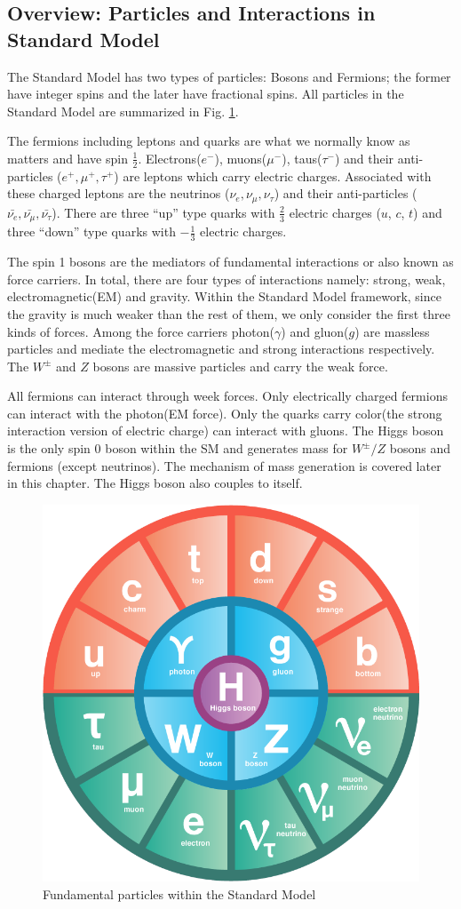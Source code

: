 \label{sec:theory-sm}
\subsection{Overview: Particles and Interactions in Standard Model}

The Standard Model has two types of particles: Bosons and Fermions; the former have integer spins and the later have fractional spins. All particles in the Standard Model are summarized in Fig. \ref{fig:theory-sm}.

The fermions including leptons and quarks are what we normally know as matters and have spin $\frac{1}{2}$. Electrons($e^-$), muons($\mu^-$), taus($\tau^{-}$) and their anti-particles ($e^+,\mu^+,\tau^+$) are leptons which carry electric charges. Associated with these charged leptons are the neutrinos ($\nu_e,\nu_{\mu},\nu_{\tau}$) and their anti-particles ($\bar{\nu_e},\bar{\nu_{\mu}},\bar{\nu_{\tau}}$). There are three ``up'' type quarks with $\frac{2}{3}$ electric charges ($u$, $c$, $t$) and three ``down'' type quarks with $-\frac{1}{3}$ electric charges. 

The spin 1 bosons are the mediators of fundamental interactions or also known as force carriers. In total, there are four types of interactions namely: strong, weak, electromagnetic(EM) and gravity. Within the Standard Model framework, since the gravity is much weaker than the rest of them, we only consider the first three kinds of forces. Among the force carriers photon($\gamma$) and gluon($g$) are massless particles and mediate the electromagnetic and strong interactions respectively. The $W^{\pm}$ and $Z$ bosons are massive particles and carry the weak force. 

All fermions can interact through week forces. Only electrically charged fermions can interact with the photon(EM force). Only the quarks carry color(the strong interaction version of electric charge) can interact with gluons. The Higgs boson is the only spin 0 boson within the SM and generates mass for $W^{\pm}/Z$ bosons and fermions (except neutrinos). The mechanism of mass generation is covered later in this chapter. The Higgs boson also couples to itself. 

\begin{figure}[htpb!]
\begin{center}
  \includegraphics[width=0.45\linewidth]{figures/theory/SM}
\caption{Fundamental particles within the Standard Model}
\label{fig:theory-sm}
\end{center}
\end{figure}

